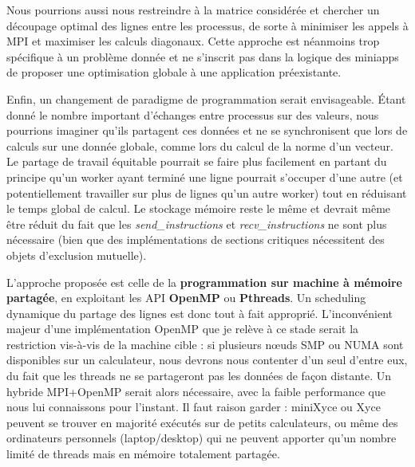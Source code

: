 \documentclass[11pt,a4paper,oneside]{memoir}
\theoremstyle{definition}
\theoremstyle{remark}
\theoremstyle{plain}
\begin{document}
Nous pourrions aussi nous restreindre à la matrice considérée et chercher un découpage optimal des lignes entre les processus, de sorte à minimiser les appels à MPI et maximiser les calculs diagonaux. Cette approche est néanmoins trop spécifique à un problème donnée et ne s'inscrit pas dans la logique des miniapps de proposer une optimisation globale à une application préexistante.\medskip

Enfin, un changement de paradigme de programmation serait envisageable. \'Etant donné le nombre important d'échanges entre processus sur des valeurs, nous pourrions imaginer qu'ils partagent ces données et ne se synchronisent que lors de calculs sur une donnée globale, comme lors du calcul de la norme d'un vecteur. Le partage de travail équitable pourrait se faire plus facilement en partant du principe qu'un worker ayant terminé une ligne pourrait s'occuper d'une autre (et potentiellement travailler sur plus de lignes qu'un autre worker) tout en réduisant le temps global de calcul. Le stockage mémoire reste le même et devrait même être réduit du fait que les \textit{send\_instructions} et \textit{recv\_instructions} ne sont plus nécessaire (bien que des implémentations de sections critiques nécessitent des objets d'exclusion mutuelle).

L'approche proposée est celle de la \textbf{programmation sur machine à mémoire partagée}, en exploitant les API \textbf{OpenMP} ou \textbf{Pthreads}. Un scheduling dynamique du partage des lignes est donc tout à fait approprié. L'inconvénient majeur d'une implémentation OpenMP que je relève à ce stade serait la restriction vis-à-vis de la machine cible : si plusieurs nœuds SMP ou NUMA sont disponibles sur un calculateur, nous devrons nous contenter d'un seul d'entre eux, du fait que les threads ne se partageront pas les données de façon distante. Un hybride MPI+OpenMP serait alors nécessaire, avec la faible performance que nous lui connaissons pour l'instant. Il faut raison garder : miniXyce ou Xyce peuvent se trouver en majorité exécutés sur de petits calculateurs, ou même des ordinateurs personnels (laptop/desktop) qui ne peuvent apporter qu'un nombre limité de threads mais en mémoire totalement partagée.
\end{document}
